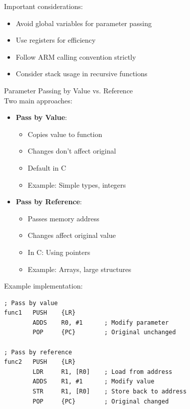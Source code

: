 \begin{remark}
Important considerations:
\begin{itemize}
  \item Avoid global variables for parameter passing
  \item Use registers for efficiency
  \item Follow ARM calling convention strictly
  \item Consider stack usage in recursive functions
\end{itemize}
\end{remark}

\begin{KR}{Parameter Passing by Value vs. Reference}\\
Two main approaches:
\begin{itemize}
  \item \textbf{Pass by Value}:
    \begin{itemize}
      \item Copies value to function
      \item Changes don't affect original
      \item Default in C
      \item Example: Simple types, integers
    \end{itemize}
  \item \textbf{Pass by Reference}:
    \begin{itemize}
      \item Passes memory address
      \item Changes affect original value
      \item In C: Using pointers
      \item Example: Arrays, large structures
    \end{itemize}
\end{itemize}

Example implementation:
\begin{lstlisting}[language=armasm, style=basesmol]
; Pass by value
func1   PUSH    {LR}
        ADDS    R0, #1      ; Modify parameter
        POP     {PC}        ; Original unchanged

; Pass by reference
func2   PUSH    {LR}
        LDR     R1, [R0]    ; Load from address
        ADDS    R1, #1      ; Modify value
        STR     R1, [R0]    ; Store back to address
        POP     {PC}        ; Original changed
\end{lstlisting}
\end{KR}

